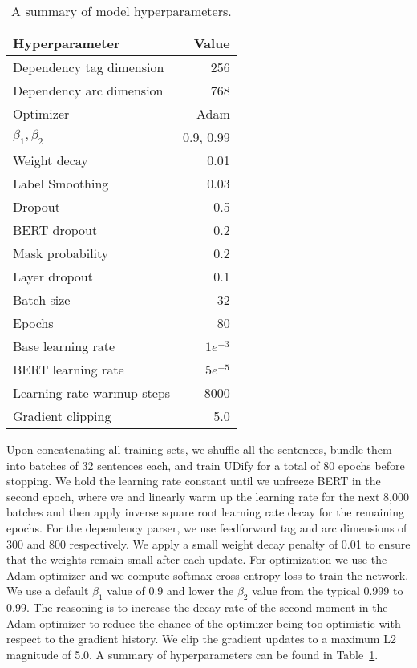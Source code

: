 \documentclass[11pt,a4paper]{article}
\begin{document}
\begin{table}[htbp]
\small
    \begin{center}
    \begin{tabular}{@{}lr@{}}
    \toprule
        \sc Hyperparameter & \sc Value \\
    \midrule
        Dependency tag dimension       & 256 \\
        Dependency arc dimension       & 768 \\
        Optimizer          & Adam \\
        $\beta_1,\beta_2$  & 0.9, 0.99 \\
        Weight decay       & 0.01 \\
        Label Smoothing    & 0.03 \\
        Dropout            & 0.5 \\
        BERT dropout       & 0.2 \\
        Mask probability   & 0.2 \\
        Layer dropout      & 0.1 \\
        Batch size         & 32 \\
        Epochs             & 80 \\
        Base learning rate            & $1e^{-3}$ \\
        BERT learning rate            & $5e^{-5}$ \\
        Learning rate warmup steps    & 8000 \\
        Gradient clipping  & 5.0 \\
    \bottomrule
    \end{tabular}
    \end{center}
    \caption{\label{table:hyperparameters}
        A summary of model hyperparameters.
    }
\end{table}

Upon concatenating all training sets, we shuffle all the sentences, bundle them into batches of 32 sentences each, and train UDify for a total of 80 epochs before stopping.
We hold the learning rate constant until we unfreeze BERT in the second epoch, where we and linearly warm up the learning rate for the next 8,000 batches and then apply inverse square root learning rate decay for the remaining epochs.
For the dependency parser, we use feedforward tag and arc dimensions of 300 and 800 respectively.
We apply a small weight decay penalty of 0.01 to ensure that the weights remain small after each update.
For optimization we use the Adam optimizer and we compute softmax cross entropy loss to train the network.
We use a default $\beta_1$ value of 0.9 and lower the $\beta_2$ value from the typical 0.999 to 0.99. The reasoning is to increase the decay rate of the second moment in the Adam optimizer to reduce the chance of the optimizer being too optimistic with respect to the gradient history.
We clip the gradient updates to a maximum L2 magnitude of 5.0. A summary of hyperparameters can be found in Table~\ref{table:hyperparameters}.
\end{document}
